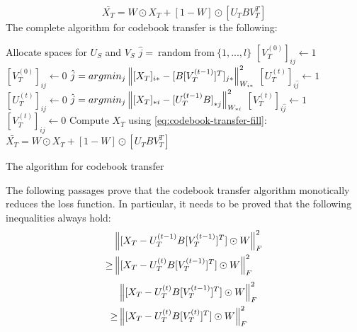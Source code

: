 \begin{equation}
\label{eq:codebook-transfer-fill}
\bar{X_T} = W \odot X_T + [1 - W] \odot [U_T B V_T^T]
\end{equation}
The complete algorithm for codebook transfer is the following:
\vskip 0.7cm
\begin{algorithm}[H]
Allocate spaces for $U_S$ and $V_S$\;
{
  $\hat{j} =\ \text{random from}\ \{1,...,l\}$\;
  $[V_T^{(0)}]_{i\hat{j}} \gets 1$\;
  {
    $[V_T^{(0)}]_{ij} \gets 0$\;
  }
}
{
  {
    $\hat{j} = argmin_j \left\lVert[X_T]_{i*} - [B [V_T^{(t - 1)}]^T]_{j*}\right\rVert_{W_{i*}}^2$\;
    $[U_T^{(t)}]_{i\hat{j}} \gets 1$\;
    {
      $[U_T^{(t)}]_{ij} \gets 0$\;
    }
  }
  {
    $\hat{j} = argmin_j \left\lVert[X_T]_{*i} - {[U_T^{(t - 1)} B]}_{*j}\right\rVert_{W_{*i}}^2$\;
    $[V_T^{(t)}]_{i\hat{j}} \gets 1$\;
    {
      $[V_T^{(t)}]_{ij} \gets 0$\;
    }
  }
}
Compute $X_T$ using \autoref{eq:codebook-transfer-fill}:
$\bar{X_T} = W \odot X_T + [1 - W] \odot [U_T B V_T^T]$\;
\caption{The algorithm for codebook transfer}
\label{al:codebook-transfer}
\end{algorithm}
\vskip 0.7cm
The following passages prove that the codebook transfer algorithm monotically reduces the loss function. In particular, it needs to be proved that the following inequalities always hold:
\begin{equation}
\label{eq:codebook-transfer-monotone-1}
\begin{split}
& \left\lVert[X_T - U_T^{(t - 1)} B [V_T^{(t - 1)}]^T] \odot W\right\rVert_F^2 \\
\geq & \left\lVert[X_T - U_T^{(t)} B [V_T^{(t - 1)}]^T] \odot W\right\rVert_F^2
\end{split}
\end{equation}
\begin{equation}
\label{eq:codebook-transfer-monotone-2}
\begin{split}
& \left\lVert[X_T - U_T^{(t)} B [V_T^{(t - 1)}]^T] \odot W\right\rVert_F^2 \\
\geq & \left\lVert[X_T - U_T^{(t)} B [V_T^{(t)}]^T] \odot W\right\rVert_F^2
\end{split}
\end{equation}
